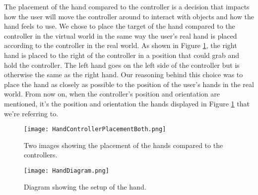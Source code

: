 The placement of the hand compared to the controller is a decision that impacts how the user will move the controller around to interact with objects and how the hand feels to use. We chose to place the target of the hand compared to the controller in the virtual world in the same way the user's real hand is placed according to the controller in the real world. As shown in Figure \ref{fig:handControllerPlacement}, the right hand is placed to the right of the controller in a position that could grab and hold the controller. The left hand goes on the left side of the controller but is otherwise the same as the right hand. Our reasoning behind this choice was to place the hand as closely as possible to the position of the user's hands in the real world. From now on, when the controller's position and orientation are mentioned, it's the position and orientation the hands displayed in Figure \ref{fig:handControllerPlacement} that we're referring to.

\begin{figure}[h]
\centering
\texttt{[image: HandControllerPlacementBoth.png]}
\caption{Two images showing the placement of the hands compared to the controllers.}
\label{fig:handControllerPlacement}
\end{figure}

\begin{figure}[h]
\centering
\texttt{[image: HandDiagram.png]}
\caption{Diagram showing the setup of the hand.}
\label{fig:handDiagram}
\end{figure}

